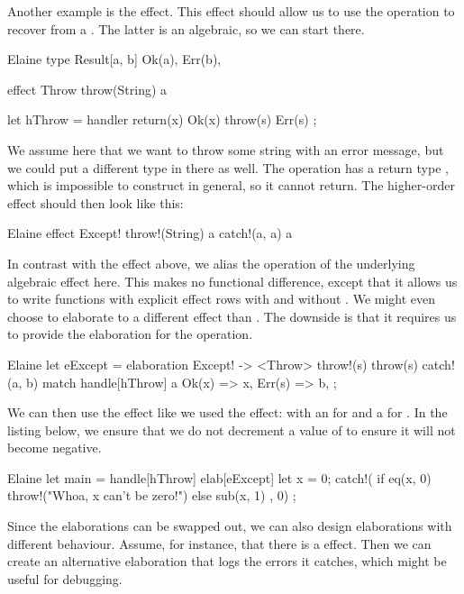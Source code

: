 Another example is the  effect. This effect should allow us to use the  operation to recover from a . The latter is an algebraic, so we can start there.

\begin{lst}{Elaine}
type Result[a, b] {
    Ok(a),
    Err(b),
}

effect Throw {
    throw(String) a
}

let hThrow = handler {
    return(x) { Ok(x) }
    throw(s) { Err(s) }
};
\end{lst}
%
We assume here that we want to throw some string with an error message, but we could put a different type in there as well. The  operation has a return type , which is impossible to construct in general, so it cannot return. The higher-order  effect should then look like this:

\begin{lst}{Elaine}
effect Except! {
    throw!(String) a
    catch!(a, a) a
}
\end{lst}
%
In contrast with the  effect above, we alias the operation of the underlying algebraic effect here. This makes no functional difference, except that it allows us to write functions with explicit effect rows with  and without . We might even choose to elaborate to a different effect than . The downside is that it requires us to provide the elaboration for the  operation.

\begin{lst}{Elaine}
let eExcept = elaboration Except! -> <Throw> {
    throw!(s) { throw(s) }
    catch!(a, b) {
        match handle[hThrow] a {
            Ok(x) => x,
            Err(s) => b,
        }
    }
};
\end{lst}
%
We can then use the  effect like we used the  effect: with an  for  and a  for . In the listing below, we ensure that we do not decrement a value of  to ensure it will not become negative.

\begin{lst}{Elaine}
let main = handle[hThrow] elab[eExcept] {
    let x = 0;
    catch!({
        if eq(x, 0) {
            throw!("Whoa, x can't be zero!")
        } else {
            sub(x, 1) 
        }
    }, 0)
};
\end{lst}
%
Since the elaborations can be swapped out, we can also design elaborations with different behaviour. Assume, for instance, that there is a  effect. Then we can create an alternative elaboration that logs the errors it catches, which might be useful for debugging.

